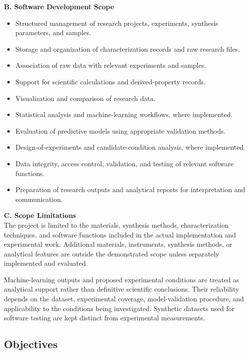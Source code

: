 \documentclass[12pt,a4paper,oneside]{report}
\begin{document}
{{{\noindent\textbf{B. Software Development Scope}
\begin{itemize}
    \item Structured management of research projects, experiments, synthesis parameters, and samples.
    \item Storage and organization of characterization records and raw research files.
    \item Association of raw data with relevant experiments and samples.
    \item Support for scientific calculations and derived-property records.
    \item Visualization and comparison of research data.
    \item Statistical analysis and machine-learning workflows, where implemented.
    \item Evaluation of predictive models using appropriate validation methods.
    \item Design-of-experiments and candidate-condition analysis, where implemented.
    \item Data integrity, access control, validation, and testing of relevant software functions.
    \item Preparation of research outputs and analytical reports for interpretation and communication.
\end{itemize}

\noindent\textbf{C. Scope Limitations}\\
The project is limited to the materials, synthesis methods, characterization techniques, and software functions included in the actual implementation and experimental work. Additional materials, instruments, synthesis methods, or analytical features are outside the demonstrated scope unless separately implemented and evaluated.

Machine-learning outputs and proposed experimental conditions are treated as analytical support rather than definitive scientific conclusions. Their reliability depends on the dataset, experimental coverage, model-validation procedure, and applicability to the conditions being investigated. Synthetic datasets used for software testing are kept distinct from experimental measurements.

\subsection{Objectives}

}}}
\end{document}
